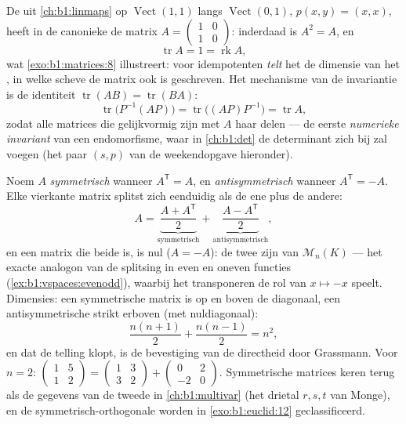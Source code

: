 \begin{example}
\label{ex:b1:matrices:tracework}
De  uit \cref{ch:b1:linmaps} op
$\operatorname{Vect}(1,1)$ langs $\operatorname{Vect}(0,1)$, $p(x,
y) = (x, x)$, heeft in de canonieke  de matrix $A =
\begin{pmatrix} 1 & 0\\ 1 & 0\end{pmatrix}$: inderdaad is $A^2 =
A$, en
\[
\operatorname{tr} A = 1 = \operatorname{rk} A ,
\]
wat \cref{exo:b1:matrices:8} illustreert: voor idempotenten
\emph{telt} het  de dimensie van het , in welke scheve
 de matrix ook is geschreven. Het mechanisme van de
invariantie is de identiteit $\operatorname{tr}(AB) =
\operatorname{tr}(BA)$:
\[
\operatorname{tr}\bigl(P^{-1}(AP)\bigr) =
\operatorname{tr}\bigl((AP)P^{-1}\bigr) = \operatorname{tr} A ,
\]
zodat alle matrices die gelijkvormig zijn met $A$ haar 
delen --- de eerste \emph{numerieke invariant} van een
endomorfisme, waar in \cref{ch:b1:det} de determinant zich bij zal
voegen (het paar $(s, p)$ van de weekendopgave hieronder).
\end{example}

\begin{example}
\label{ex:b1:matrices:symsplit}
Noem $A$ \emph{symmetrisch} wanneer $A^{\mathsf T} = A$, en
\emph{antisymmetrisch} wanneer $A^{\mathsf T} = -A$. Elke vierkante
matrix splitst zich eenduidig als de ene plus de andere:
\[
A = \underbrace{\frac{A + A^{\mathsf T}}{2}}_{\text{symmetrisch}}
+ \underbrace{\frac{A - A^{\mathsf T}}{2}}_{\text{antisymmetrisch}},
\]
en een matrix die beide is, is nul ($A = -A$): de twee
 zijn  van
$\mathcal{M}_n(K)$ --- het exacte analogon van de splitsing in even
en oneven functies (\cref{ex:b1:vspaces:evenodd}), waarbij het
transponeren de rol van $x \mapsto -x$ speelt. Dimensies: een
symmetrische matrix is  op en boven de diagonaal, een
antisymmetrische strikt erboven (met nuldiagonaal):
\[
\frac{n(n+1)}{2} + \frac{n(n-1)}{2} = n^2 ,
\]
en dat de telling klopt, is de bevestiging van de directheid door
Grassmann. Voor $n = 2$: $\begin{pmatrix} 1 & 5\\ 1 &
2\end{pmatrix} = \begin{pmatrix} 1 & 3\\ 3 & 2\end{pmatrix} +
\begin{pmatrix} 0 & 2\\ -2 & 0\end{pmatrix}$. Symmetrische matrices
keren terug als de gegevens van de tweede  in
\cref{ch:b1:multivar} (het drietal $r, s, t$ van Monge), en de
symmetrisch-orthogonale worden in \cref{exo:b1:euclid:12}
geclassificeerd.
\end{example}

